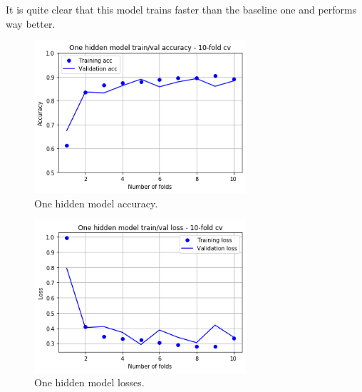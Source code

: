 \newline
It is quite clear that this model trains faster than the baseline one and performs way better.
\begin{figure}
\centering
\includegraphics[width=0.7\textwidth]{./TeX_files/img/onehiddenmodelacc.png}
\caption{One hidden model accuracy.}
\label{fig:onehiddenmodelacc}
\end{figure}
\begin{figure}
\centering
\includegraphics[width=0.7\textwidth]{./TeX_files/img/onehiddenmodelloss.png}
\caption{One hidden model losses.}
\label{fig:onehiddenmodelloss}
\end{figure} 
